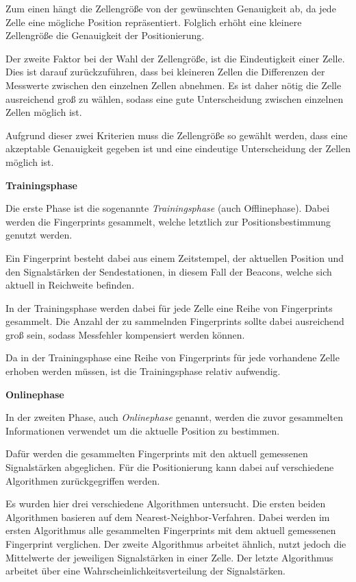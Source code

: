 Zum einen hängt die Zellengröße von der gewünschten Genauigkeit ab, da jede Zelle eine mögliche Position repräsentiert. Folglich erhöht eine kleinere Zellengröße die Genauigkeit der Positionierung.

Der zweite Faktor bei der Wahl der Zellengröße, ist die Eindeutigkeit einer Zelle. Dies ist darauf zurückzuführen, dass bei kleineren Zellen die Differenzen der Messwerte zwischen den einzelnen Zellen abnehmen.
Es ist daher nötig die Zelle ausreichend groß zu wählen, sodass eine gute Unterscheidung zwischen einzelnen Zellen möglich ist.

Aufgrund dieser zwei Kriterien muss die Zellengröße so gewählt werden, dass eine akzeptable Genauigkeit gegeben ist und eine eindeutige Unterscheidung der Zellen möglich ist.


\textbf{Trainingsphase}


Die erste Phase ist die sogenannte \emph{Trainingsphase} (auch Offlinephase). Dabei werden die Fingerprints gesammelt, welche letztlich zur Positionsbestimmung genutzt werden.

Ein Fingerprint besteht dabei aus einem Zeitstempel, der aktuellen Position und den Signalstärken der Sendestationen, in diesem Fall der Beacons, welche sich aktuell in Reichweite befinden.

In der Trainingsphase werden dabei für jede Zelle eine Reihe von Fingerprints gesammelt. Die Anzahl der zu sammelnden Fingerprints sollte dabei ausreichend groß sein, sodass Messfehler kompensiert werden können.

Da in der Trainingsphase eine Reihe von Fingerprints für jede vorhandene Zelle erhoben werden müssen, ist die Trainingsphase relativ aufwendig.


\textbf{Onlinephase}


In der zweiten Phase, auch \emph{Onlinephase} genannt, werden die zuvor gesammelten Informationen verwendet um die aktuelle Position zu bestimmen. 

Dafür werden die gesammelten Fingerprints mit den aktuell gemessenen Signalstärken abgeglichen. Für die Positionierung kann dabei auf verschiedene Algorithmen zurückgegriffen werden.

Es wurden hier drei verschiedene Algorithmen untersucht. Die ersten beiden Algorithmen basieren auf dem Nearest-Neighbor-Verfahren. Dabei werden im ersten Algorithmus alle gesammelten Fingerprints mit dem aktuell gemessenen Fingerprint verglichen. Der zweite Algorithmus arbeitet ähnlich, nutzt jedoch die Mittelwerte der jeweiligen Signalstärken in einer Zelle. 
Der letzte Algorithmus arbeitet über eine Wahrscheinlichkeitsverteilung der Signalstärken.


